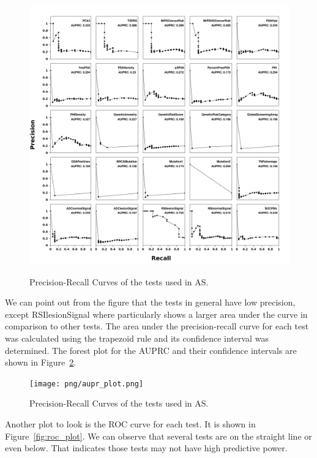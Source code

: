 \documentclass[]{article}
\begin{document}
\begin{figure}
\centering
    \includegraphics[width=150mm]{png/multipanelplot_prc.png} \\
\caption{Precision-Recall Curves of the tests used in AS.}
\label{fig:PRcurve}
\end{figure}

\noindent We can point out from the figure that the tests in general have low precision, except RSIlesionSignal where particularly shows 
a larger area under the curve in comparison to other tests. The area under the precision-recall curve for each test was 
calculated using the trapezoid rule and its confidence interval was determined. The forest plot for the AUPRC and their 
confidence intervals are shown in Figure~\ref{fig:auprc_plot}. \\
  
\begin{figure}
\centering
    \texttt{[image: png/aupr\_plot.png]} \\
\caption{Precision-Recall Curves of the tests used in AS.}
\label{fig:auprc_plot}
\end{figure}

\noindent Another plot to look is the ROC curve for each test. It is shown in Figure~\ref{fig:roc_plot}. We can observe that several tests
are on the straight line or even below. That indicates those tests may not have high predictive power. \\
\end{document}
